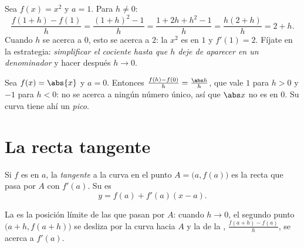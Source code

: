 \begin{example}\label{ex:g11:deriv:atpoint}
Sea $f(x) = x^2$ y $a = 1$. Para $h \neq 0$:
\[
\frac{f(1+h) - f(1)}{h}
= \frac{(1+h)^2 - 1}{h}
= \frac{1 + 2h + h^2 - 1}{h}
= \frac{h(2 + h)}{h}
= 2 + h .
\]
Cuando $h$ se acerca a $0$, esto se acerca a $2$: la  $x^2$ es
 en $1$ y $f'(1) = 2$. Fíjate en la estrategia: \emph{simplificar
el cociente hasta que $h$ deje de aparecer en un denominador} y hacer
después $h \to 0$.
\end{example}

\begin{example}
Sea $f(x) = \abs{x}$ y $a = 0$. Entonces
$\frac{f(h) - f(0)}{h} = \frac{\abs h}{h}$, que vale $1$ para $h > 0$ y
$-1$ para $h < 0$: no se acerca a ningún número único, así que $\abs x$ no
es  en $0$. Su curva tiene ahí un \emph{pico}.
\end{example}

\section{La recta tangente}

\begin{definition}[Tangente]\label{def:g11:deriv:tangent}
Si $f$ es  en $a$, la \emph{tangente} a la curva
en el punto $A = \bigl(a, f(a)\bigr)$ es la recta que pasa por $A$ con
 $f'(a)$. Su  es
\[
y = f(a) + f'(a)(x - a).
\]
\end{definition}

La  es la posición límite de las  que pasan por $A$:
cuando $h \to 0$, el segundo punto $\bigl(a+h, f(a+h)\bigr)$ se desliza
por la curva hacia $A$ y la  de la ,
$\frac{f(a+h)-f(a)}{h}$, se acerca a $f'(a)$.

